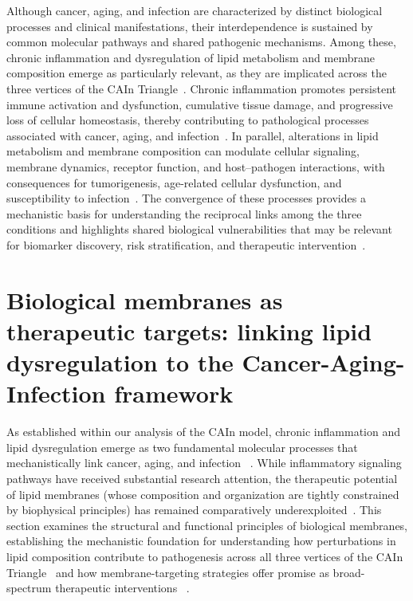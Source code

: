 Although cancer, aging, and infection are characterized by distinct biological processes and clinical manifestations, their interdependence is sustained by common molecular pathways and shared pathogenic mechanisms. Among these, chronic inflammation and dysregulation of lipid metabolism and membrane composition emerge as particularly relevant, as they are implicated across the three vertices of the CAIn Triangle~\cite{DANI_LIPIDOS,Montoliu2014,Bowman2019,Szlasa2020,Fu2021}. Chronic inflammation promotes persistent immune activation and dysfunction, cumulative tissue damage, and progressive loss of cellular homeostasis, thereby contributing to pathological processes associated with cancer, aging, and infection~\cite{inflammaging,Diakos2014,Furman2019}. In parallel, alterations in lipid metabolism and membrane composition can modulate cellular signaling, membrane dynamics, receptor function, and host--pathogen interactions, with consequences for tumorigenesis, age-related cellular dysfunction, and susceptibility to infection~\cite{Casares2019,Montoliu2014,Bowman2019,Szlasa2020,Fu2021}. The convergence of these processes provides a mechanistic basis for understanding the reciprocal links among the three conditions and highlights shared biological vulnerabilities that may be relevant for biomarker discovery, risk stratification, and therapeutic intervention~\cite{DANI_LIPIDOS}.







\section{Biological membranes as therapeutic targets: linking lipid dysregulation to the Cancer-Aging-Infection framework}

As established within our analysis of the CAIn model, chronic inflammation and lipid dysregulation emerge as two fundamental molecular processes that mechanistically link cancer, aging, and infection ~\cite{Diakos2014,Furman2019,Casares2019}. While inflammatory signaling pathways have received substantial research attention, the therapeutic potential of lipid membranes (whose composition and organization are tightly constrained by biophysical principles) has remained comparatively underexploited~\cite{Casares2019}. This section examines the structural and functional principles of biological membranes, establishing the mechanistic foundation for understanding how perturbations in lipid composition contribute to pathogenesis across all three vertices of the CAIn Triangle~\cite{Montoliu2014,Bowman2019,Szlasa2020,Fu2021} and how membrane-targeting strategies offer promise as broad-spectrum therapeutic interventions ~\cite{Casares2019,Fu2021}.

